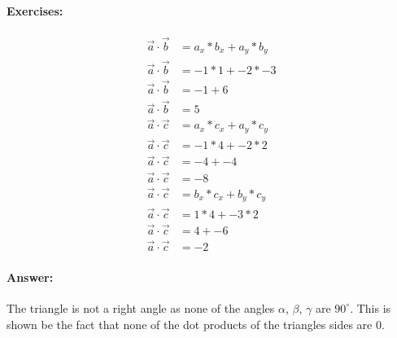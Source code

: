 \paragraph{Exercises:}
\begin{align}
    \vec{a} \cdot \vec{b} &= a_x * b_x + a_y * b_y \\
    \vec{a} \cdot \vec{b} &= -1 * 1 + -2 * -3 \\
    \vec{a} \cdot \vec{b} &= -1 + 6 \\
    \vec{a} \cdot \vec{b} &= 5 \\[20pt]
    \vec{a} \cdot \vec{c} &= a_x * c_x + a_y * c_y \\
    \vec{a} \cdot \vec{c} &= -1 * 4 + -2 * 2 \\
    \vec{a} \cdot \vec{c} &= -4 + -4 \\
    \vec{a} \cdot \vec{c} &= -8 \\[20pt]
    \vec{a} \cdot \vec{c} &= b_x * c_x + b_y * c_y \\
    \vec{a} \cdot \vec{c} &= 1 * 4 + -3 * 2 \\
    \vec{a} \cdot \vec{c} &= 4 + -6 \\
    \vec{a} \cdot \vec{c} &= -2
\end{align}

\paragraph{Answer:}
The triangle is not a right angle as none of the angles $\alpha$, $\beta$, $\gamma$ are $90^\circ$.
This is shown be the fact that none of the dot products of the triangles sides are 0.
